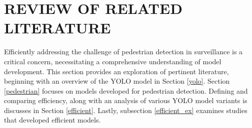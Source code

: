 \chapter{REVIEW OF RELATED LITERATURE}  

Efficiently addressing the challenge of pedestrian detection in surveillance is a critical concern, necessitating a comprehensive understanding of model development. This section provides an exploration of pertinent literature, beginning with an overview of the YOLO model in Section \ref{yolo}. Section \ref{pedestrian} focuses on models developed for pedestrian detection. Defining and comparing efficiency, along with an analysis of various YOLO model variants is discusses in Section \ref{efficient}. Lastly, subsection \ref{efficient_ex} examines studies that developed efficient models.



% 




